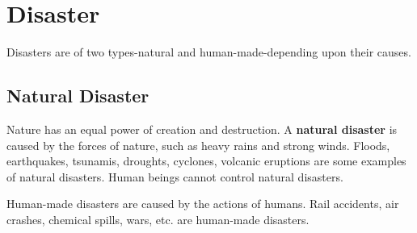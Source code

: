 \section{Disaster}
Disasters are of two types-natural and human-made-depending upon their causes.
\subsection{Natural Disaster}
Nature has an equal power of creation and destruction. A \textbf{natural disaster} is caused by the forces of nature, such as heavy rains and strong winds. Floods, earthquakes, tsunamis, droughts, cyclones, volcanic eruptions are some examples of natural disasters. Human beings cannot control natural disasters.
\vspace{0.1in}
\par
Human-made disasters are caused by the actions of humans. Rail accidents, air crashes, chemical spills, wars, etc. are human-made disasters.
